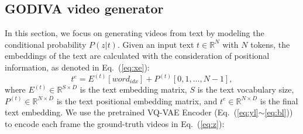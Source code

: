 \documentclass{article}
\begin{document}
\subsection{GODIVA video generator} \label{sec:GODIVA}

In this section, we focus on generating videos from text by modeling the conditional probability $P(z|t)$.
Given an input text $t\in \mathbb{R}^N$ with $N$ tokens, the embeddings of the text are calculated with the consideration of positional information, as denoted in Eq.~(\ref{eq:xe}):
\begin{equation} \label{eq:xe} 
t^e=E^{(t)}[word_{idx}] + P^{(t)}[0,1,...,N-1],
\end{equation}
where $E^{(t)}\in \mathbb{R}^{S\times D}$ is the text embedding matrix, $S$ is the text vocabulary size, $P^{(t)}\in \mathbb{R}^{N\times D}$ is the text positional embedding matrix, and $t^e\in \mathbb{R}^{N\times D}$ is the final text embedding. We use the pretrained VQ-VAE Encoder (Eq.~(\ref{eq:yl}$\sim$\ref{eq:bl})) to encode each frame the ground-truth videos in  Eq.~(\ref{eq:z}):
\end{document}
